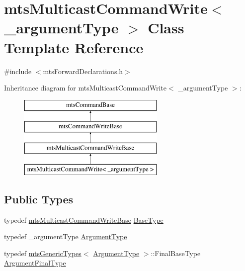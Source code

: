 \hypertarget{classmts_multicast_command_write}{}\section{mts\+Multicast\+Command\+Write$<$ \+\_\+argument\+Type $>$ Class Template Reference}
\label{classmts_multicast_command_write}


{\ttfamily \#include $<$mts\+Forward\+Declarations.\+h$>$}

Inheritance diagram for mts\+Multicast\+Command\+Write$<$ \+\_\+argument\+Type $>$\+:\begin{figure}[H]
\begin{center}
\leavevmode
\includegraphics[height=4.000000cm]{d2/ddb/classmts_multicast_command_write}
\end{center}
\end{figure}
\subsection*{Public Types}
\begin{DoxyCompactItemize}
\item 
typedef \hyperlink{classmts_multicast_command_write_base}{mts\+Multicast\+Command\+Write\+Base} \hyperlink{classmts_multicast_command_write_aa950168043db4770666c31d84145a37a}{Base\+Type}
\item 
typedef \+\_\+argument\+Type \hyperlink{classmts_multicast_command_write_a064ab3c37be15f5f41dc6fd39595f207}{Argument\+Type}
\item 
typedef \hyperlink{classmts_generic_types}{mts\+Generic\+Types}$<$ \hyperlink{classmts_multicast_command_write_a064ab3c37be15f5f41dc6fd39595f207}{Argument\+Type} $>$\+::Final\+Base\+Type \hyperlink{classmts_multicast_command_write_a6a53ad6556ef466ffc58b8800ca81f46}{Argument\+Final\+Type}
\end{DoxyCompactItemize}
